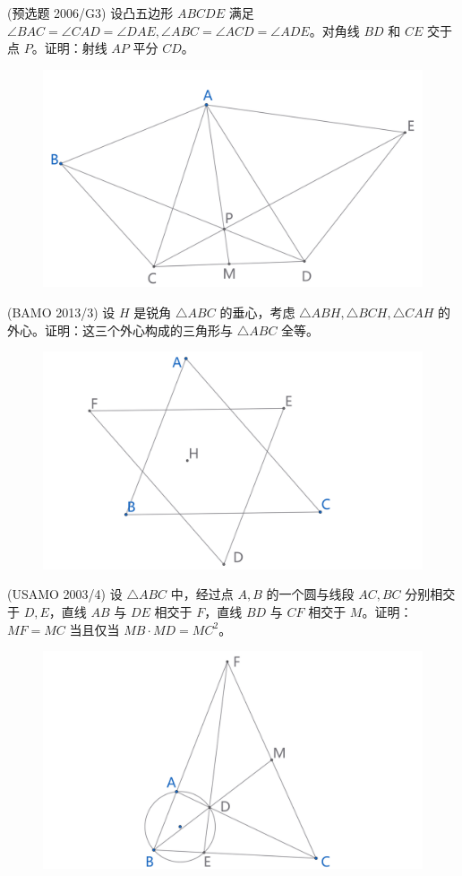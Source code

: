 \begin{exercise}
(预选题 2006/G3) 设凸五边形 $ABCDE$ 满足 $\angle BAC = \angle CAD = \angle DAE, \angle ABC = \angle ACD = \angle ADE$。对角线 $BD$ 和 $CE$ 交于点 $P$。证明：射线 $AP$ 平分 ${CD}$。
\end{exercise}
\begin{figure}[H]
    \centering
    \includegraphics[width=0.7\linewidth]{figures/exercises/319.png}
\end{figure}


\newpage 
\begin{exercise}
    (BAMO 2013/3) 设 $H$ 是锐角 $\triangle ABC$ 的垂心，考虑 $\triangle ABH, \triangle BCH, \triangle CAH$ 的外心。证明：这三个外心构成的三角形与 $\triangle ABC$ 全等。
\end{exercise}
\begin{figure}[H]
    \centering
    \includegraphics[width=0.7\linewidth]{figures/exercises/320.png}
\end{figure}

\begin{exercise}
    (USAMO 2003/4) 设 $\triangle ABC$ 中，经过点 $A, B$ 的一个圆与线段 $AC, BC$ 分别相交于 $D, E$，直线 $AB$ 与 $DE$ 相交于 $F$，直线 $BD$ 与 $CF$ 相交于 $M$。证明：$MF = MC$ 当且仅当 $MB \cdot MD = MC^2$。
\end{exercise}
\begin{figure}[H]
    \centering
    \includegraphics[width=0.7\linewidth]{figures/exercises/321.png}
\end{figure}

